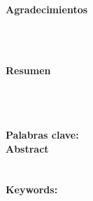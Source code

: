 \begin{flushright}
\begin{minipage}{8cm}
    \noindent
        \small
        
\end{minipage}
\end{flushright}

\newpage{\pagestyle{empty}\cleardoublepage}

\newpage
\thispagestyle{empty} \textbf{}\normalsize
\\\\\\%
\textbf{\LARGE Agradecimientos}
\\\\


\newpage{\pagestyle{empty}\cleardoublepage}

\newpage
\textbf{\LARGE Resumen}
\\\\
\\[2.0cm]

\textbf{\small Palabras clave: }\\


\textbf{\LARGE Abstract}\\\\
\\[2.0cm]
\textbf{\small Keywords: }\\